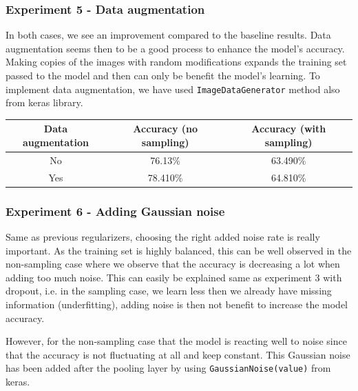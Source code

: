\documentclass[11pt, openany]{report}
\theoremstyle{plain}
\theoremstyle{definition}
\theoremstyle{remark}
\begin{document}
\subsubsection{Experiment 5 - Data augmentation} 

In both cases, we see an improvement compared to the baseline results. Data augmentation seems then to be a good process to enhance the model's accuracy. Making copies of the images with random modifications expands the training set passed to the model and then can only be benefit the model's learning. To implement data augmentation, we have used \texttt{ImageDataGenerator} method also from keras library.   

\begin{center}
\begin{tabular}{|c|c|c|}
  \hline
  Data augmentation & Accuracy (no sampling) & Accuracy (with sampling) \\
  \hline
  No & 76.13\% & 63.490\% \\
  Yes & 78.410\% & 64.810\% \\
  \hline
\end{tabular}
\end{center}

\subsubsection{Experiment 6 - Adding Gaussian noise} 
Same as previous regularizers, choosing the right added noise rate is really important. As the training set is highly balanced, this can be well observed in the non-sampling case where we observe that the accuracy is decreasing a lot when adding too much noise. This can easily be explained same as experiment 3 with dropout, i.e. in the sampling case, we learn less then we already have missing information (underfitting), adding noise is then not benefit to increase the model accuracy.

However, for the non-sampling case that the model is reacting well to noise since that the accuracy is not fluctuating at all and keep constant. This Gaussian noise has been added after the pooling layer by using \texttt{GaussianNoise(value)} from keras.   
\end{document}

